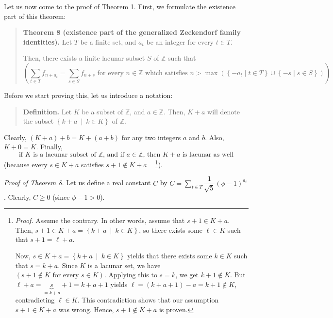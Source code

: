 \documentclass[12pt,final,notitlepage,onecolumn]{article}%
\begin{document}
Let us now come to the proof of Theorem 1. First, we formulate the existence
part of this theorem:

\begin{quote}
\textbf{Theorem 8 (existence part of the generalized Zeckendorf family
identities).} Let $T$ be a finite set, and $a_{t}$ be an integer for every
$t\in T$.

Then, there exists a finite lacunar subset $S$ of $\mathbb{Z}$ such that
\[
\left(  \sum\limits_{t\in T}f_{n+a_{t}}=\sum\limits_{s\in S}f_{n+s}\text{ for
every }n\in\mathbb{Z}\text{ which satisfies }n>\max\left(  \left\{  -a_{t}\mid
t\in T\right\}  \cup\left\{  -s\mid s\in S\right\}  \right)  \right)  .
\]



\end{quote}

Before we start proving this, let us introduce a notation:

\begin{quote}
\textbf{Definition.} Let $K$ be a subset of $\mathbb{Z}$, and $a\in\mathbb{Z}%
$. Then, $K+a$ will denote the subset $\left\{  k+a\ \mid\ k\in K\right\}  $
of $\mathbb{Z}$.
\end{quote}

Clearly, $\left(  K+a\right)  +b=K+\left(  a+b\right)  $ for any two integers
$a$ and $b$. Also, $K+0=K$. Finally,%
\begin{equation}
\text{if }K\text{ is a lacunar subset of }\mathbb{Z}\text{, and if }%
a\in\mathbb{Z}\text{, then }K+a\text{ is lacunar as well} \label{lacunar-plus}%
\end{equation}
(because every $s\in K+a$ satisfies $s+1\notin K+a\ \ \ \ $%
\footnote{\textit{Proof.} Assume the contrary. In other words, assume that
$s+1\in K+a$. Then, $s+1\in K+a=\left\{  k+a\ \mid\ k\in K\right\}  $, so
there exists some $\ell\in K$ such that $s+1=\ell+a$.
\par
Now, $s\in K+a=\left\{  k+a\ \mid\ k\in K\right\}  $ yields that there exists
some $k\in K$ such that $s=k+a$. Since $K$ is a lacunar set, we have $\left(
s+1\notin K\text{ for every }s\in K\right)  $. Applying this to $s=k$, we get
$k+1\notin K$. But $\ell+a=\underbrace{s}_{=k+a}+1=k+a+1$ yields $\ell=\left(
k+a+1\right)  -a=k+1\notin K$, contradicting $\ell\in K$. This contradiction
shows that our assumption $s+1\in K+a$ was wrong. Hence, $s+1\notin K+a$ is
proven.}).

\textit{Proof of Theorem 8.} Let us define a real constant $C$ by
$C=\sum\limits_{t\in T}\dfrac{1}{\sqrt{5}}\left(  \phi-1\right)  ^{a_{t}}$.
Clearly, $C\geq0$ (since $\phi-1>0$).
\end{document}
